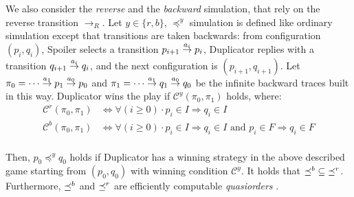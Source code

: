 We also consider the \emph{reverse} and the \emph{backward} simulation,
that rely on the reverse transition $\rightarrow_R$.
Let $y \in \{r,b\}$, $\preceq^y$ simulation is defined like ordinary simulation
except that transitions are taken backwards:
from configuration $(p_i,q_i)$, Spoiler selects a transition
$p_{i+1} \overset{a_i}{\rightarrow} p_i$, Duplicator replies with a transition $q_{i+1} \overset{a_i}{\rightarrow} q_i$,
and the next configuration is $(p_{i+1}, q_{i+1})$.
Let $\pi_0 = \cdots \overset{a_1}{\rightarrow} p_1 \overset{a_0}{\rightarrow} p_0$ and
$\pi_1 = \cdots \overset{a_1}{\rightarrow} q_1 \overset{a_0}{\rightarrow} q_0$ be the infinite backward
traces built in this way.
Duplicator wins the play if $\mathcal{C}^y(\pi_0,\pi_1)$ holds, where:
\begin{equation*} \label{eq1}
\begin{split}
\mathcal{C}^{r}(\pi_0,\pi_1) & \Longleftrightarrow
\forall (i \geq 0)  \cdot p_i \in I \Longrightarrow q_i \in I\\
\mathcal{C}^{b}(\pi_0,\pi_1) & \Longleftrightarrow
\forall (i \geq 0) \cdot
p_i \in I \Longrightarrow q_i \in I \textrm{ and }
p_i \in F \Longrightarrow q_i \in F \\
\end{split}
\end{equation*}

Then, $p_0 \preceq^y q_0$ holds if Duplicator has a winning strategy in the
above described game starting from $(p_0,q_0)$ with winning condition $\mathcal{C}^y$.
It holds that $\mathord{\preceq^b} \subseteq \mathord{\preceq^r}$.
Furthermore, $\preceq^b$ and $\preceq^r$ are efficiently computable \emph{quasiorders} \cite{somenzi2000efficient}.

